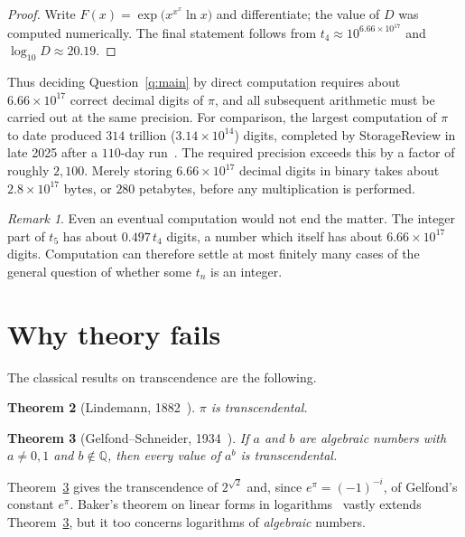 \documentclass[11pt]{amsart}
\newtheorem{theorem}{Theorem}[section]
\theoremstyle{definition}
\theoremstyle{remark}
\newtheorem{remark}[theorem]{Remark}
\newcommand{\Q}{\mathbb{Q}}
\begin{document}
\begin{proof}
Write $F(x) = \exp\bigl(x^{x^{x}} \ln x\bigr)$ and differentiate; the value of $D$ was computed numerically. The final statement follows from $t_4 \approx 10^{6.66\times10^{17}}$ and $\log_{10} D \approx 20.19$.
\end{proof}

Thus deciding Question~\ref{q:main} by direct computation requires about $6.66\times 10^{17}$ correct decimal digits of $\pi$, and all subsequent arithmetic must be carried out at the same precision. For comparison, the largest computation of $\pi$ to date produced $314$ trillion ($3.14\times10^{14}$) digits, completed by StorageReview in late 2025 after a $110$-day run~\cite{livescience}. The required precision exceeds this by a factor of roughly $2{,}100$. Merely storing $6.66\times10^{17}$ decimal digits in binary takes about $2.8\times 10^{17}$ bytes, or $280$ petabytes, before any multiplication is performed.

\begin{remark}
Even an eventual computation would not end the matter. The integer part of $t_5$ has about $0.497\, t_4$ digits, a number which itself has about $6.66\times10^{17}$ digits. Computation can therefore settle at most finitely many cases of the general question of whether some $t_n$ is an integer.
\end{remark}

\section{Why theory fails}\label{sec:theory}

The classical results on transcendence are the following.

\begin{theorem}[Lindemann, 1882~\cite{lindemann}]
$\pi$ is transcendental.
\end{theorem}

\begin{theorem}[Gelfond--Schneider, 1934~\cite{gelfond,schneider}]\label{thm:gs}
If $a$ and $b$ are algebraic numbers with $a \ne 0, 1$ and $b \notin \Q$, then every value of $a^{b}$ is transcendental.
\end{theorem}

Theorem~\ref{thm:gs} gives the transcendence of $2^{\sqrt2}$ and, since $e^{\pi} = (-1)^{-i}$, of Gelfond's constant $e^{\pi}$. Baker's theorem on linear forms in logarithms~\cite{baker} vastly extends Theorem~\ref{thm:gs}, but it too concerns logarithms of \emph{algebraic} numbers.
\end{document}
